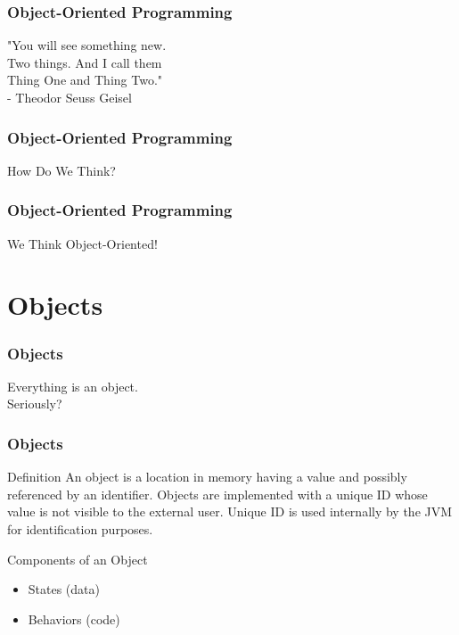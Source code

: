 \documentclass[10pt, compress]{beamer}
\begin{document}
\begin{frame}[fragile]
	\frametitle{Object-Oriented Programming}
	\begin{center}
		"You will see something new.\\
		Two things. And I call them\\
		Thing One and Thing Two."\\
		- Theodor Seuss Geisel
	\end{center}
\end{frame}

\begin{frame}[fragile]
	\frametitle{Object-Oriented Programming}
	\begin{center}
		How Do We Think?
	\end{center}
\end{frame}

\begin{frame}[fragile]
	\frametitle{Object-Oriented Programming}
	\begin{center}
		We Think Object-Oriented!
	\end{center}
\end{frame}

\section{Objects}

\begin{frame}[fragile]
	\frametitle{Objects}
	\begin{center}
		Everything is an object.\\
		Seriously?
	\end{center}
\end{frame}

\begin{frame}[fragile]
	\frametitle{Objects}
	\begin{block}{Definition}
	An object is a location in memory having a value and possibly referenced by an identifier. Objects are implemented with a unique ID whose value is not visible to the external user. Unique ID is used internally by the JVM for identification purposes.
	\end{block}
	\begin{block}{Components of an Object}
		\begin{itemize}
			\item[] States (data)
			\item[] Behaviors (code)
		\end{itemize}
	\end{block}
\end{frame}
\end{document}
